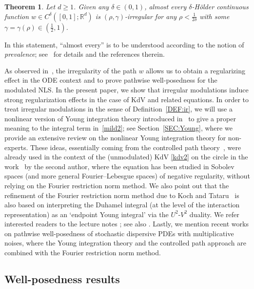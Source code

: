 \documentclass[letterpaper, 11pt,  reqno]{amsart}
\newtheorem{oldtheorem}{Theorem}
\newcommand{\1}{\hspace{0.5mm}\text{I}\hspace{0.5mm}}
\newcommand{\R}{\mathbb{R}}
\newcommand{\dl}{\delta}
\newcommand{\g}{\gamma}
\numberwithin{equation}{section}
\numberwithin{theorem}{section}
\begin{document}
\begin{oldtheorem}
\label{THM:B}
Let  $d \ge 1$.
Given  any $\delta \in (0,1)$, almost every $\dl$-H\"older continuous  function $w \in C^\delta([0,1];\R^d)$ 
 is $(\rho,\g)$-irregular for any $\rho < \frac1{2\delta}$ with  some $\gamma = \gamma(\rho) \in (\frac 12,1)$.
\end{oldtheorem}


In this statement, ``almost every'' is to be understood according to the notion of {\it prevalence}; see~\cite{GG} for details and the  references therein.


As observed in~\cite{CatellierGubinelli,CG1}, the irregularity of the path $w$ allows 
us to obtain a regularizing effect in the ODE context and 
to prove pathwise well-posedness for 
the modulated  NLS.
In the present paper, we show that irregular modulations 
induce strong regularization effects 
in the case of  KdV
and related  equations.
In order to treat 
 irregular modulations in the sense of Definition~\ref{DEF:ir},
we will use a nonlinear version of Young integration theory introduced in~\cite{CG1}
to give a proper meaning to the integral term in~\eqref{mild2};
see Section~\ref{SEC:Young}, 
where we provide an extensive review on the nonlinear Young integration theory
for non-experts.
These ideas, essentially coming from the controlled  path theory~\cite{Gub04}, were already used in the context of the (unmodulated)  KdV \eqref{kdv2} on the circle  in the work~\cite{GubinelliKdV} 
by the second author, 
where the equation has been studied in Sobolev spaces (and more general Fourier--Lebesgue spaces) 
of negative regularity, 
without relying on the Fourier restriction norm method.
We also point out that the refinement of the Fourier restriction norm method
due to Koch and Tataru~\cite{KT}
is also based on interpreting the Duhamel integral (at the level of the interaction representation)
as an `endpoint Young integral' via the $U^2$-$V^2$ duality.
We refer interested readers to the lecture notes \cite{Koch};
see also \cite{HHK}.
Lastly, we  mention recent works \cite{COZ, CLO2}
on 
pathwise well-posedness of stochastic dispersive PDEs
with multiplicative noises, 
where 
the Young integration theory and 
the controlled path approach 
are combined with
the Fourier restriction norm method.
 



\subsection{Well-posedness results}
\end{document}
